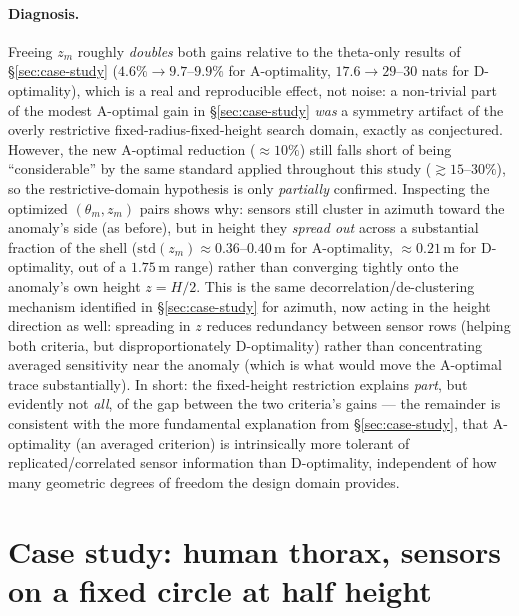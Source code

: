 \documentclass[11pt,a4paper]{article}
\begin{document}
\paragraph{Diagnosis.} Freeing $z_m$ roughly \emph{doubles} both gains relative to the
theta-only results of \S\ref{sec:case-study} ($4.6\%\to 9.7$--$9.9\%$ for A-optimality, $17.6\to
29$--$30$ nats for D-optimality), which is a real and reproducible effect, not noise: a non-trivial part of the
modest A-optimal gain in \S\ref{sec:case-study} \emph{was} a symmetry artifact of the
overly restrictive fixed-radius-fixed-height search domain, exactly as conjectured. However, the new
A-optimal reduction ($\approx 10\%$) still falls short of being ``considerable'' by the same
standard applied throughout this study ($\gtrsim 15$--$30\%$), so the restrictive-domain hypothesis
is only \emph{partially} confirmed. Inspecting the optimized $(\theta_m,z_m)$ pairs shows why:
sensors still cluster in azimuth toward the anomaly's side (as before), but in height they
\emph{spread out} across a substantial fraction of the shell ($\mathrm{std}(z_m) \approx 0.36$--$0.40\,$m
for A-optimality, $\approx 0.21\,$m for D-optimality, out of a $1.75\,$m range) rather than
converging tightly onto the anomaly's own height $z=H/2$. This is the same
decorrelation/de-clustering mechanism identified in \S\ref{sec:case-study} for azimuth, now acting
in the height direction as well: spreading in $z$ reduces redundancy between sensor rows (helping
both criteria, but disproportionately D-optimality) rather than concentrating averaged sensitivity
near the anomaly (which is what would move the A-optimal trace substantially). In short: the
fixed-height restriction explains \emph{part}, but evidently not \emph{all}, of the gap between the
two criteria's gains --- the remainder is consistent with the more fundamental explanation from
\S\ref{sec:case-study}, that A-optimality (an averaged criterion) is intrinsically more tolerant of
replicated/correlated sensor information than D-optimality, independent of how many geometric
degrees of freedom the design domain provides.

\section{Case study: human thorax, sensors on a fixed circle at half height}
\label{sec:case-study-thorax}
\end{document}
